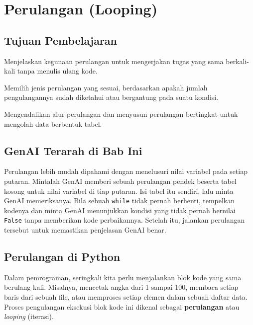\chapter{Perulangan (Looping)}

\section*{Tujuan Pembelajaran}
\begin{daftarrapat}
  \item Menjelaskan kegunaan perulangan untuk mengerjakan tugas yang sama berkali-kali tanpa menulis ulang kode.
  \item Memilih jenis perulangan yang sesuai, berdasarkan apakah jumlah pengulangannya sudah diketahui atau bergantung pada suatu kondisi.
  \item Mengendalikan alur perulangan dan menyusun perulangan bertingkat untuk mengolah data berbentuk tabel.
\end{daftarrapat}

\section*{GenAI Terarah di Bab Ini}

Perulangan lebih mudah dipahami dengan menelusuri nilai variabel pada setiap putaran. Mintalah GenAI memberi sebuah perulangan pendek beserta tabel kosong untuk nilai variabel di tiap putaran. Isi tabel itu sendiri, lalu minta GenAI memeriksanya. Bila sebuah \texttt{while} tidak pernah berhenti, tempelkan kodenya dan minta GenAI menunjukkan kondisi yang tidak pernah bernilai \texttt{False} tanpa memberikan kode perbaikannya. Setelah itu, jalankan perulangan tersebut untuk memastikan penjelasan GenAI benar.

\section{Perulangan di Python}
Dalam pemrograman, seringkali kita perlu menjalankan blok kode yang sama berulang kali. 
Misalnya, mencetak angka dari 1 sampai 100, membaca setiap baris dari sebuah file, atau 
memproses setiap elemen dalam sebuah daftar data. 
Proses pengulangan eksekusi blok kode ini dikenal sebagai \textbf{perulangan} atau \textit{looping} (iterasi).

